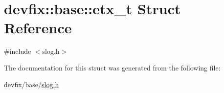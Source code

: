 \hypertarget{structdevfix_1_1base_1_1etx__t}{}\section{devfix\+:\+:base\+:\+:etx\+\_\+t Struct Reference}
\label{structdevfix_1_1base_1_1etx__t}


{\ttfamily \#include $<$slog.\+h$>$}



The documentation for this struct was generated from the following file\+:\begin{DoxyCompactItemize}
\item 
devfix/base/\hyperlink{slog_8h}{slog.\+h}\end{DoxyCompactItemize}
